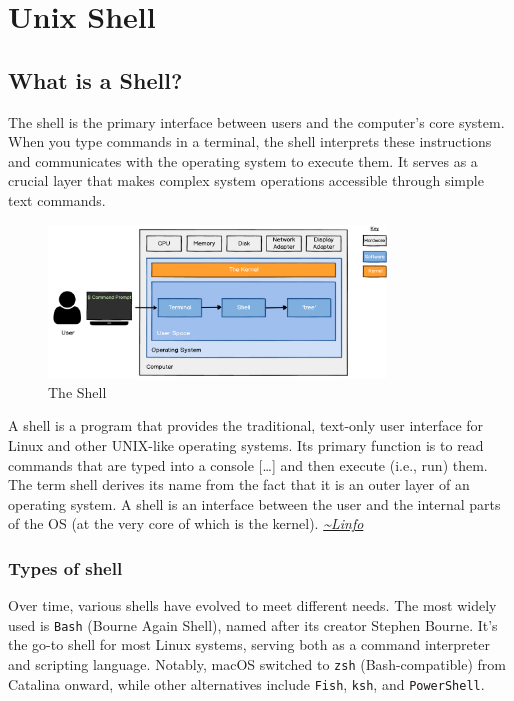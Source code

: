 
\chapter{Unix Shell}

\section{What is a Shell?}

The shell is the primary interface between users and the computer's core system. When you type commands in a terminal, the shell interprets these instructions and communicates with the operating system to execute them. It serves as a crucial layer that makes complex system operations accessible through simple text commands.

\begin{figure}[H]
    \centering
    \includegraphics[width=0.8\textwidth]{assets/shell.png}
    \caption{The Shell}
    \label{fig:shell}
\end{figure}

\begin{definitionblock}[Shell]
    A shell is a program that provides the traditional, text-only user interface for Linux and other UNIX-like operating systems. Its primary function is to read commands that are typed into a console […] and then execute (i.e., run) them. The term shell derives its name from the fact that it is an outer layer of an operating system. A shell is an interface between the user and the internal parts of the OS (at the very core of which is the kernel). 
    \hfill \textit{\href{http://www.linfo.org/shell.html}{\textasciitilde Linfo}}
\end{definitionblock}

\subsection{Types of shell}

Over time, various shells have evolved to meet different needs. The most widely used is \texttt{Bash} (Bourne Again Shell), named after its creator Stephen Bourne. It's the go-to shell for most Linux systems, serving both as a command interpreter and scripting language.
Notably, macOS switched to \texttt{zsh} (Bash-compatible) from Catalina onward, while other alternatives include \texttt{Fish}, \texttt{ksh}, and \texttt{PowerShell}.

